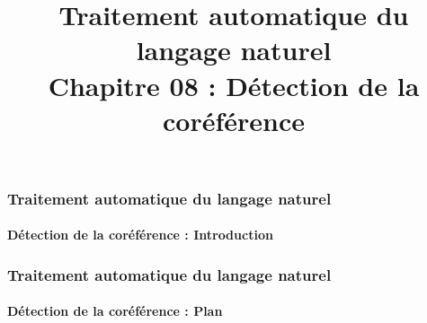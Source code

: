 \documentclass[xcolor=table]{beamer}
\title[TALN : 08- Détection de la coréférence]%
{Traitement automatique du langage naturel\\Chapitre 08 : Détection de la coréférence}
\begin{document}
	
\begin{frame}
\frametitle{Traitement automatique du langage naturel}
\framesubtitle{Détection de la coréférence : Introduction}



\end{frame}

%
%

\begin{frame}
\frametitle{Traitement automatique du langage naturel}
\framesubtitle{Détection de la coréférence : Plan}

\begin{multicols}{2}
\tableofcontents
\end{multicols}
\end{frame}
\end{document}
